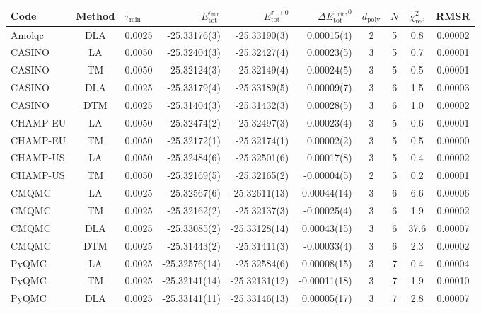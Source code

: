 \begin{tabular}{|lc|lr|r|r|cccc|}
\toprule
Code & Method & $\tau_\text{min}$ & $E_\text{tot}^{\tau_\text{min}}$ & $E_\text{tot}^{\tau\to 0}$ & $\Delta E_\text{tot}^{\tau_\text{min},0}$ & $d_\text{poly}$ & $N$ & $\chi^2_\textrm{red}$ & RMSR \\
\midrule
Amolqc           &  DLA  & 0.0025 & -25.33176(3) & -25.33190(3) & 0.00015(4) & 2 & 5 & 0.8 & 0.00002 \\
CASINO           &  LA   & 0.0050 & -25.32404(3) & -25.32427(4) & 0.00023(5) & 3 & 5 & 0.7 & 0.00001 \\
CASINO           &  TM   & 0.0050 & -25.32124(3) & -25.32149(4) & 0.00024(5) & 3 & 5 & 0.5 & 0.00001 \\
CASINO           &  DLA  & 0.0025 & -25.33179(4) & -25.33189(5) & 0.00009(7) & 3 & 6 & 1.5 & 0.00003 \\
CASINO           &  DTM  & 0.0025 & -25.31404(3) & -25.31432(3) & 0.00028(5) & 3 & 6 & 1.0 & 0.00002 \\
CHAMP-EU         &  LA   & 0.0050 & -25.32474(2) & -25.32497(3) & 0.00023(4) & 3 & 5 & 0.6 & 0.00001 \\
CHAMP-EU         &  TM   & 0.0050 & -25.32172(1) & -25.32174(1) & 0.00002(2) & 3 & 5 & 0.5 & 0.00000 \\
CHAMP-US         &  LA   & 0.0050 & -25.32484(6) & -25.32501(6) & 0.00017(8) & 3 & 5 & 0.4 & 0.00002 \\
CHAMP-US         &  TM   & 0.0050 & -25.32169(5) & -25.32165(2) & -0.00004(5) & 2 & 5 & 0.2 & 0.00001 \\
CMQMC            &  LA   & 0.0025 & -25.32567(6) & -25.32611(13) & 0.00044(14) & 3 & 6 & 6.6 & 0.00006 \\
CMQMC            &  TM   & 0.0025 & -25.32162(2) & -25.32137(3) & -0.00025(4) & 3 & 6 & 1.9 & 0.00002 \\
CMQMC            &  DLA  & 0.0025 & -25.33085(2) & -25.33128(14) & 0.00043(15) & 3 & 6 & 37.6 & 0.00007 \\
CMQMC            &  DTM  & 0.0025 & -25.31443(2) & -25.31411(3) & -0.00033(4) & 3 & 6 & 2.3 & 0.00002 \\
PyQMC            &  LA   & 0.0025 & -25.32576(14) & -25.32584(6) & 0.00008(15) & 3 & 7 & 0.4 & 0.00004 \\
PyQMC            &  TM   & 0.0025 & -25.32141(14) & -25.32131(12) & -0.00011(18) & 3 & 7 & 1.9 & 0.00010 \\
PyQMC            &  DLA  & 0.0025 & -25.33141(11) & -25.33146(13) & 0.00005(17) & 3 & 7 & 2.8 & 0.00007 \\

\end{tabular}
